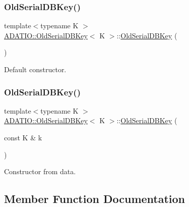 \subsubsection{\texorpdfstring{OldSerialDBKey()}{OldSerialDBKey()}\hspace{0.1cm}{\footnotesize\ttfamily [3/4]}}
{\footnotesize\ttfamily template$<$typename K $>$ \\
\mbox{\hyperlink{classADATIO_1_1OldSerialDBKey}{A\+D\+A\+T\+I\+O\+::\+Old\+Serial\+D\+B\+Key}}$<$ K $>$\+::\mbox{\hyperlink{classADATIO_1_1OldSerialDBKey}{Old\+Serial\+D\+B\+Key}} (\begin{DoxyParamCaption}{ }\end{DoxyParamCaption})\hspace{0.3cm}{\ttfamily [inline]}}



Default constructor. 

\mbox{\label{classADATIO_1_1OldSerialDBKey_a3b075f5aaa5e0d5e29f5a5dcfe51d575}} 
\subsubsection{\texorpdfstring{OldSerialDBKey()}{OldSerialDBKey()}\hspace{0.1cm}{\footnotesize\ttfamily [4/4]}}
{\footnotesize\ttfamily template$<$typename K $>$ \\
\mbox{\hyperlink{classADATIO_1_1OldSerialDBKey}{A\+D\+A\+T\+I\+O\+::\+Old\+Serial\+D\+B\+Key}}$<$ K $>$\+::\mbox{\hyperlink{classADATIO_1_1OldSerialDBKey}{Old\+Serial\+D\+B\+Key}} (\begin{DoxyParamCaption}\item[{const K \&}]{k }\end{DoxyParamCaption})\hspace{0.3cm}{\ttfamily [inline]}}



Constructor from data. 



\subsection{Member Function Documentation}
\mbox{\label{classADATIO_1_1OldSerialDBKey_a9f6e624dc2c8940397632286dbab1f61}} 

